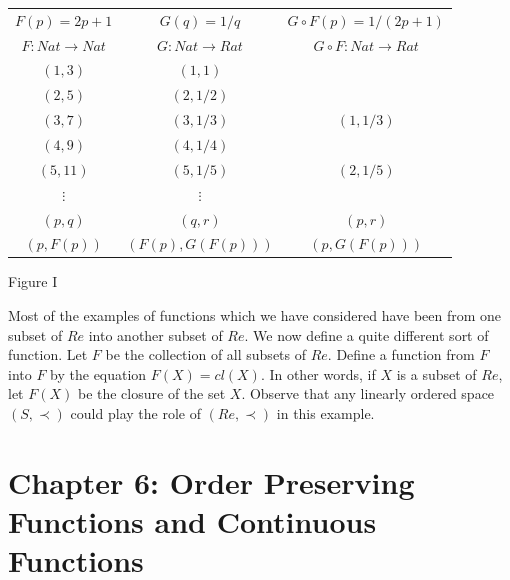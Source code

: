 \documentclass{book}
\begin{document}
\begin{description}
\begin{center}
\begin{tabular}{ccc}
  $F(p) = 2p + 1$         & $G(q) = 1/q$            & $G \circ F(p) = 1/(2p + 1)$      \\
  $F:Nat \rightarrow Nat$ & $G:Nat \rightarrow Rat$ & $G \circ F: Nat \rightarrow Rat$ \\
  $(1,3)$                 & $(1,1)$                 &                                  \\
  $(2,5)$                 & $(2,1/2)$               &                                  \\
  $(3,7)$                 & $(3,1/3)$               & $(1,1/3)$                        \\
  $(4,9)$                 & $(4,1/4)$               &                                  \\
  $(5,11)$                & $(5,1/5)$               & $(2,1/5)$                        \\
  $\vdots$                & $\vdots$                &                                  \\
  $(p,q)$                 & $(q,r)$                 & $(p,r)$                          \\
  $(p, F(p))$             & $(F(p), G(F(p)) )$      & $(p, G(F(p)) )$                  \\
\end{tabular}
\end{center}
\begin{center}
Figure I
\end{center}

\item[Example 5.47:] Most of the examples of functions which we have considered have been from one subset of $Re$ into another subset of $Re$. We now define a quite different sort of function. Let $F$ be the collection of all subsets of $Re$. Define a function from $F$ into $F$ by the equation $F(X) = cl(X)$. In other words, if $X$ is a subset of $Re$, let $F(X)$ be the closure of the set $X$. Observe that any linearly ordered space $(S, \prec)$ could play the role of $(Re, \prec)$ in this example.

\end{description}





\chapter*{Chapter 6: Order Preserving Functions and Continuous Functions}
\end{document}
